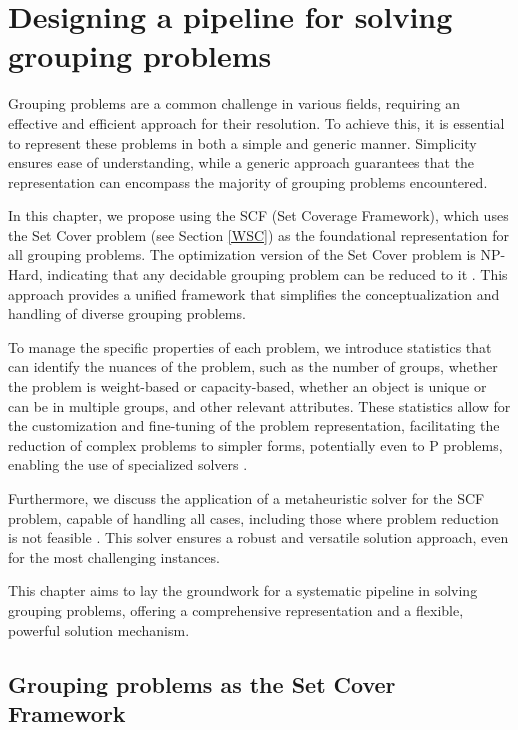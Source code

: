 

\chapter{Designing a pipeline for solving grouping problems} \label{chap:design}

    Grouping problems are a common challenge in various fields, requiring an effective and efficient approach for their resolution. To achieve this, it is essential to represent these problems in both a simple and generic manner. Simplicity ensures ease of understanding, while a generic approach guarantees that the representation can encompass the majority of grouping problems encountered.
    
    In this chapter, we propose using the SCF (Set Coverage Framework), which uses the Set Cover problem (see Section \ref{WSC}) as the foundational representation for all grouping problems. The optimization version of the Set Cover problem is NP-Hard, indicating that any decidable grouping problem can be reduced to it \cite{garey1979computers}. This approach provides a unified framework that simplifies the conceptualization and handling of diverse grouping problems.
    
    To manage the specific properties of each problem, we introduce statistics that can identify the nuances of the problem, such as the number of groups, whether the problem is weight-based or capacity-based, whether an object is unique or can be in multiple groups, and other relevant attributes. These statistics allow for the customization and fine-tuning of the problem representation, facilitating the reduction of complex problems to simpler forms, potentially even to P problems, enabling the use of specialized solvers \cite{ieee_survey}.
    
    Furthermore, we discuss the application of a metaheuristic solver for the SCF problem, capable of handling all cases, including those where problem reduction is not feasible \cite{ren2021matching}. This solver ensures a robust and versatile solution approach, even for the most challenging instances.
    
    This chapter aims to lay the groundwork for a systematic pipeline in solving grouping problems, offering a comprehensive representation and a flexible, powerful solution mechanism.
    
    \section{Grouping problems as the Set Cover Framework}

